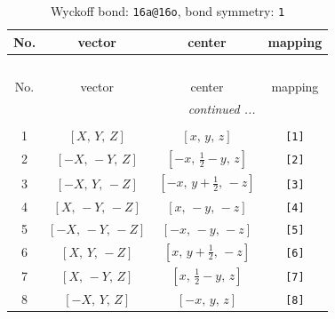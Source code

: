 \documentclass[fleqn,8pt]{jsarticle}
\begin{document}
\begin{longtable}{cccc}
\caption{Wyckoff bond: {\tt 16a@16o}, bond symmetry: {\tt 1}}
 \\
 \hline \hline
No. & vector & center & mapping \\ \hline \endfirsthead

\multicolumn{3}{l}{\tablename\ \thetable{}} \\
 \hline \hline
No. & vector & center & mapping \\ \hline \endhead

 \hline \hline
\multicolumn{3}{r}{\footnotesize\it continued ...} \\ \endfoot

 \hline \hline
\multicolumn{3}{r}{} \\ \endlastfoot

1 & $\left[ X,\, Y,\, Z \right]$ & $\left[ x,\, y,\, z \right]$ & {\tt [1]} \\ \hline
2 & $\left[ - X,\, - Y,\, Z \right]$ & $\left[ - x,\, \frac{1}{2} - y,\, z \right]$ & {\tt [2]} \\ \hline
3 & $\left[ - X,\, Y,\, - Z \right]$ & $\left[ - x,\, y + \frac{1}{2},\, - z \right]$ & {\tt [3]} \\ \hline
4 & $\left[ X,\, - Y,\, - Z \right]$ & $\left[ x,\, - y,\, - z \right]$ & {\tt [4]} \\ \hline
5 & $\left[ - X,\, - Y,\, - Z \right]$ & $\left[ - x,\, - y,\, - z \right]$ & {\tt [5]} \\ \hline
6 & $\left[ X,\, Y,\, - Z \right]$ & $\left[ x,\, y + \frac{1}{2},\, - z \right]$ & {\tt [6]} \\ \hline
7 & $\left[ X,\, - Y,\, Z \right]$ & $\left[ x,\, \frac{1}{2} - y,\, z \right]$ & {\tt [7]} \\ \hline
8 & $\left[ - X,\, Y,\, Z \right]$ & $\left[ - x,\, y,\, z \right]$ & {\tt [8]} \\
\end{longtable}
\end{document}
